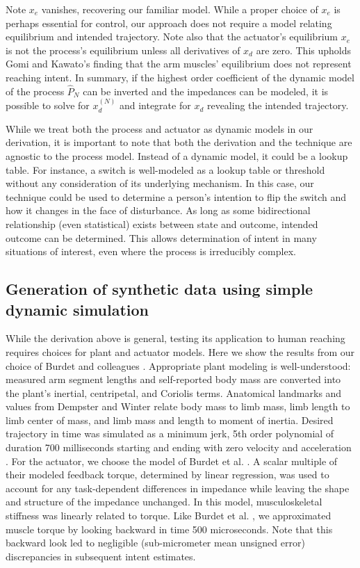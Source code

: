 \documentclass[10pt]{article}
\begin{document}
Note $x_e$ vanishes, recovering our familiar model. While a proper choice of $x_e$ is perhaps essential for control, our approach does not require a model relating equilibrium and intended trajectory. Note also that the actuator's equilibrium $x_e$ is not the process's equilibrium unless all derivatives of $x_d$ are zero. This upholds Gomi and Kawato's finding that the arm muscles' equilibrium does not represent reaching intent\cite{gomi1997human}. In summary, if the highest order coefficient of the dynamic model of the process $\hat{P}_N$ can be inverted and the impedances can be modeled, it is possible to solve for $x_d^{(N)}$ and integrate for $x_d$ revealing the intended trajectory.

While we treat both the process and actuator as dynamic models in our derivation, it is important to note that both the derivation and the technique are agnostic to the process model. Instead of a dynamic model, it could be a lookup table. For instance, a switch is well-modeled as a lookup table or threshold without any consideration of its underlying mechanism. In this case, our technique could be used to determine a person's intention to flip the switch and how it changes in the face of disturbance. As long as some bidirectional relationship (even statistical) exists between state and outcome, intended outcome can be determined. This allows determination of intent in many situations of interest, even where the process is irreducibly complex.

\subsection*{Generation of synthetic data using simple dynamic simulation}
While the derivation above is general, testing its application to human reaching requires choices for plant and actuator models. Here we show the results from our choice of Burdet and colleagues \cite{burdet2006stability}. Appropriate plant modeling is well-understood: measured arm segment lengths and self-reported body mass are converted into the plant's inertial, centripetal, and Coriolis terms. Anatomical landmarks and values from Dempster \cite{dempster1955space} and Winter \cite{winter2009biomechanics} relate body mass to limb mass, limb length to limb center of mass, and limb mass and length to moment of inertia. Desired trajectory in time was simulated as a minimum jerk, 5th order polynomial of duration 700 milliseconds starting and ending with zero velocity and acceleration \cite{flash1985coordination}. For the actuator, we choose the model of Burdet et al. \cite{burdet2006stability}. A scalar multiple of their modeled feedback torque, determined by linear regression, was used to account for any task-dependent differences in impedance \cite{franklin2003adaptation} while leaving the shape and structure of the impedance unchanged. In this  model, musculoskeletal stiffness was linearly related to torque. Like Burdet et al. \cite{burdet2006stability}, we approximated muscle torque by looking backward in time 500 microseconds. Note that this backward look led to negligible (sub-micrometer mean unsigned error) discrepancies in subsequent intent estimates. 
\end{document}
